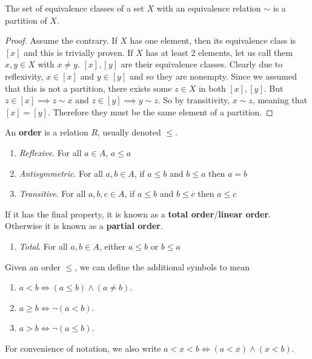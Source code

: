   \begin{theorem}[]
    The set of equivalence classes of a set $X$ with an equivalence relation $\sim$ is a partition of $X$. 
  \end{theorem} 
  \begin{proof}
    Assume the contrary. If $X$ has one element, then its equivalence class is $[x]$ and this is trivially proven. If $X$ has at least 2 elements, let us call them $x, y \in X$ with $x \neq y$. $[x], [y]$ are their equivalence classes. Clearly due to reflexivity, $x \in [x]$ and $y \in [y]$ and so they are nonempty. Since we assumed that this is not a partition, there exists some $z \in X$ in both $[x], [y]$. But $z \in [x] \implies z \sim x$ and $z \in [y] \implies y \sim z$. So by transitivity, $x \sim z$, meaning that $[x] = [y]$. Therefore they must be the same element of a partition. 
  \end{proof}

  \begin{definition}[Order]
    An \textbf{order} is a relation $R$, usually denoted $\leq$. 
    \begin{enumerate}
      \item \textit{Reflexive}. For all $a \in A$, $a \leq a$
      \item \textit{Antisymmetric}. For all $a,b \in A$, if $a \leq b$ and $b \leq a$ then $a=b$
      \item \textit{Transitive}. For all $a,b,c \in A$, if $a \leq b$ and $b \leq c$ then $a \leq c$
    \end{enumerate} 
    If it has the final property, it is known as a \textbf{total order}/\textbf{linear order}. Otherwise it is known as a \textbf{partial order}. 
    \begin{enumerate}
      \item \textit{Total}. For all $a,b \in A$, either $a \leq b$ or $b \leq a$
    \end{enumerate} 
    Given an order $\leq$, we can define the additional symbols to mean 
    \begin{enumerate}
      \item $a < b \iff (a \leq b) \land (a \neq b)$. 
      \item $a \geq b \iff \neg(a < b)$. 
      \item $a > b \iff \neg(a \leq b)$. 
    \end{enumerate} 
  \end{definition} 

  For convenience of notation, we also write $a < x < b \iff (a < x) \land (x < b)$. 

